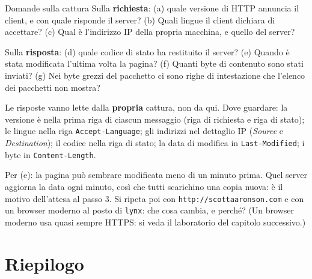 \begin{esercizio}{Domande sulla cattura}
Sulla \textbf{richiesta}: (a) quale versione di HTTP annuncia il client, e con quale risponde il server?
(b) Quali lingue il client dichiara di accettare? (c) Qual è l'indirizzo IP della propria macchina, e quello del
server?

Sulla \textbf{risposta}: (d) quale codice di stato ha restituito il server? (e) Quando è stata modificata
l'ultima volta la pagina? (f) Quanti byte di contenuto sono stati inviati? (g) Nei byte grezzi del pacchetto
ci sono righe di intestazione che l'elenco dei pacchetti non mostra?

\svolgimento
Le risposte vanno lette dalla \textbf{propria} cattura, non da qui. Dove guardare: la versione è nella prima
riga di ciascun messaggio (riga di richiesta e riga di stato); le lingue nella riga \texttt{Accept-Language};
gli indirizzi nel dettaglio IP (\emph{Source} e \emph{Destination}); il codice nella riga di stato; la data di
modifica in \texttt{Last-Modified}; i byte in \texttt{Content-Length}.

Per (e): la pagina può sembrare modificata meno di un minuto prima. Quel server aggiorna la data ogni minuto,
così che tutti scarichino una copia nuova: è il motivo dell'attesa al passo 3. Si ripeta poi con
\texttt{http://scottaaronson.com} e con un browser moderno al posto di \texttt{lynx}: che cosa cambia, e perché?
(Un browser moderno usa quasi sempre HTTPS: si veda il laboratorio del capitolo successivo.)
\end{esercizio}

\section{Riepilogo}

